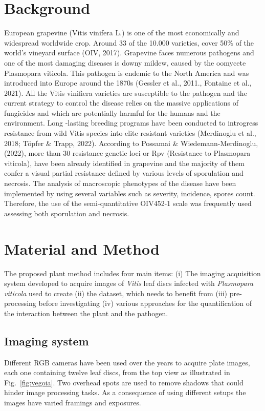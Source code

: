 \documentclass[english]{article}
\begin{document}

\begin{abstract}

\end{abstract}

\section{Background}
European grapevine (Vitis vinifera L.) is one of the most economically and widespread worldwide crop. Around 33 of the  10.000 varieties,  cover 50\% of the world's vineyard surface (OIV, 2017).
Grapevine faces numerous pathogens and one of the most damaging diseases is downy mildew, caused by the oomycete Plasmopara viticola. This pathogen is endemic to the North America and was introduced into Europe around the 1870s (Gessler et al., 2011., Fontaine et al., 2021). All the Vitis vinifiera varieties are susceptible to the pathogen and the current strategy to control the disease  relies on the massive applications of fungicides and which are potentially harmful for the humans and the environment. Long -lasting breeding programs have been conducted to introgress resistance from wild Vitis species into elite resistant varieties (Merdinoglu et al., 2018; Töpfer \& Trapp, 2022). According to Possamai \& Wiedemann-Merdinoglu, (2022), more than 30 resistance genetic loci or Rpv (Resistance to Plasmopara viticola), have been already identified in grapevine and the majority of them confer a visual partial resistance defined by various levels of sporulation and  necrosis. The analysis of macroscopic phenotypes of the disease have been implemented by using several variables such as severity, incidence, spores count. Therefore, the use of the semi-quantitative OIV452-1 scale was frequently used assessing both sporulation and necrosis.

\section{Material and Method}

The proposed plant method includes four main items: (i) The imaging acquisition system developed to acquire images of \textit{Vitis} leaf discs infected with \textit{Plasmopara viticola} used to create (ii) the dataset, which needs to benefit from (iii) pre-processing before investigating (iv) various approaches for the quantification of the interaction between the plant and the pathogen.

\subsection{Imaging system}
Different RGB cameras have been used over the years to acquire plate images, each one containing twelve leaf discs, from the top view as illustrated in Fig.~\ref{fig:vegoia}. Two overhead spots are used to remove shadows that could hinder image processing tasks. As a consequence of using different setups the images have varied framings and exposures.
\end{document}
